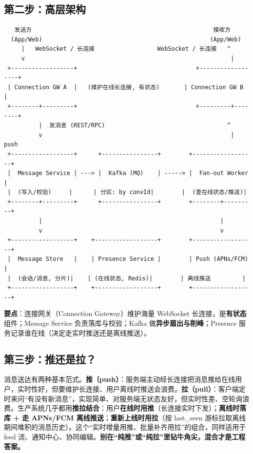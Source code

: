 \subsection{第二步：高层架构}

\begin{lstlisting}
   发送方                                                    接收方
  (App/Web)                                                (App/Web)
     |   WebSocket / 长连接                  WebSocket / 长连接   ^
     v                                                           |
 +------------------+                                  +------------------+
 | Connection GW A  |   (维护在线长连接, 有状态)       | Connection GW B  |
 +--------+---------+                                  +---------+--------+
          |  发消息 (REST/RPC)                                   ^
          v                                                      | push
 +------------------+      +----------------+        +------------------+
 |  Message Service | ---> |  Kafka (MQ)    | -----> |  Fan-out Worker  |
 |  (写入/校验)     |      | 分区: by convId|        |  (查在线状态/推送)|
 +--------+---------+      +----------------+        +--------+---------+
          |                                                   |
          v                                                   v
 +------------------+    +------------------+        +------------------+
 |  Message Store   |    | Presence Service |        | Push (APNs/FCM)  |
 |  (会话/消息, 分片)|    | (在线状态, Redis)|        | 离线推送         |
 +------------------+    +------------------+        +------------------+
\end{lstlisting}

\textbf{要点}：连接网关（Connection Gateway）维护海量 WebSocket 长连接，是\textbf{有状态}组件；Message Service 负责落库与校验；Kafka 做\textbf{异步扇出与削峰}；Presence 服务记录谁在线（决定走实时推送还是离线推送）。

\subsection{第三步：推还是拉？}

\begin{idea}
消息送达有两种基本范式。\textbf{推（push）}：服务端主动经长连接把消息推给在线用户，实时性好，但要维护长连接、用户离线时推送会浪费。\textbf{拉（pull）}：客户端定时来问“有没有新消息”，实现简单、对服务端无状态友好，但实时性差、空轮询浪费。生产系统几乎都用\textbf{推拉结合}：用户\textbf{在线时用推}（长连接实时下发）；\textbf{离线时落库 + 走 APNs/FCM 离线推送}；\textbf{重新上线时用拉}（按 last\_seen 游标拉取离线期间堆积的消息历史）。这个“实时增量用推、批量补齐用拉”的组合，同样适用于 feed 流、通知中心、协同编辑。\textbf{别在“纯推”或“纯拉”里钻牛角尖，混合才是工程答案。}
\end{idea}

